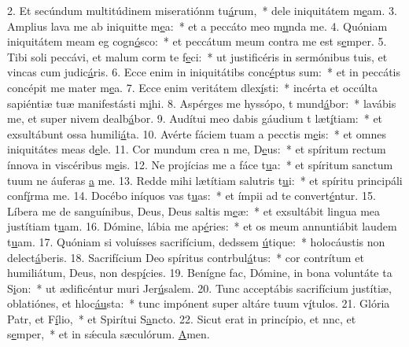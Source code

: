 2. Et secúndum multitúdinem miseratiónm tu\uline{á}rum,~* dele iniquitátem m\uline{e}am.
3. Amplius lava me ab iniquitte m\uline{e}a:~* et a peccáto meo m\uline{u}nda me.
4. Quóniam iniquitátem meam eg cogn\uline{ó}sco:~* et peccátum meum contra me est s\uline{e}mper.
5. Tibi soli peccávi, et malum corm te f\uline{e}ci:~* ut justificéris in sermónibus tuis, et vincas cum judic\uline{á}ris.
6. Ecce enim in iniquitátibs conc\uline{é}ptus sum:~* et in peccátis concépit me mater m\uline{e}a.
7. Ecce enim veritátem dlex\uline{í}sti:~* incérta et occúlta sapiéntiæ tuæ manifestásti m\uline{i}hi.
8. Aspérges me hyssópo, t mund\uline{á}bor:~* lavábis me, et super nivem dealb\uline{á}bor.
9. Audítui meo dabis gáudium t læt\uline{í}tiam:~* et exsultábunt ossa humili\uline{á}ta.
10. Avérte fáciem tuam a pecctis m\uline{e}is:~* et omnes iniquitátes meas d\uline{e}le.
11. Cor mundum crea n me, D\uline{e}us:~* et spíritum rectum ínnova in viscéribus m\uline{e}is.
12. Ne projícias me a fáce t\uline{u}a:~* et spíritum sanctum tuum ne áuferas \uline{a} me.
13. Redde mihi lætítiam salutris t\uline{u}i:~* et spíritu principáli conf\uline{í}rma me.
14. Docébo iníquos vas t\uline{u}as:~* et ímpii ad te convert\uline{é}ntur.
15. Líbera me de sanguínibus, Deus, Deus saltis m\uline{e}æ:~* et exsultábit lingua mea justítiam t\uline{u}am.
16. Dómine, lábia me ap\uline{é}ries:~* et os meum annuntiábit laudem t\uline{u}am.
17. Quóniam si voluísses sacrifícium, dedssem \uline{ú}tique:~* holocáustis non delect\uline{á}beris.
18. Sacrifícium Deo spíritus contrbul\uline{á}tus:~* cor contrítum et humiliátum, Deus, non desp\uline{í}cies.
19. Benígne fac, Dómine, in bona voluntáte ta S\uline{i}on:~* ut ædificéntur muri Jer\uline{ú}salem.
20. Tunc acceptábis sacrifícium justítiæ, oblatiónes, et hloc\uline{áu}sta:~* tunc impónent super altáre tuum v\uline{í}tulos.
21. Glória Patr, et F\uline{í}lio,~* et Spirítui S\uline{a}ncto.
22. Sicut erat in princípio, et nnc, et s\uline{e}mper,~* et in sǽcula sæculórum. \uline{A}men.
